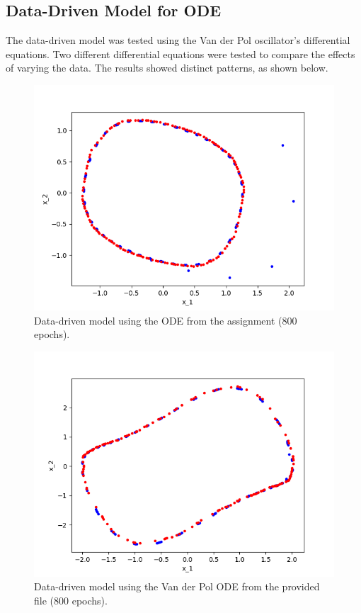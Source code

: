 \documentclass{article}
\begin{document}
\subsection{Data-Driven Model for ODE}
The data-driven model was tested using the Van der Pol oscillator’s differential equations. Two different differential equations were tested to compare the effects of varying the data. The results showed distinct patterns, as shown below.

\begin{figure}[h!]
    \centering
    \includegraphics[scale=0.4]{figs/Vander_Test01.png}
    \caption{Data-driven model using the ODE from the assignment (800 epochs).}
\end{figure}

\begin{figure}[h!]
    \centering
    \includegraphics[scale=0.4]{figs/Vander_Test02.png}
    \caption{Data-driven model using the Van der Pol ODE from the provided file (800 epochs).}
\end{figure}
\end{document}
